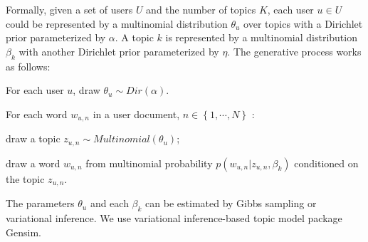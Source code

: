 \documentclass[preprint]{elsarticle}
\begin{document}
Formally, given a set of users $ U $ and the number of topics $ K $, each user $ u \in U $ could be represented by a multinomial distribution $ \theta_{u} $ over topics with a Dirichlet prior parameterized by $ \alpha $. 
A topic $ k $ is represented by a multinomial distribution $ \beta_{k} $ with another Dirichlet prior parameterized by $ \eta $. 
The generative process works as follows:
\begin{itemize*}
\item For each user $ u $, draw $ \theta_{u} \sim Dir \left(  \alpha \right) $.
\item For each word $ w_{u,n} $ in a user document, $ n \in \left\lbrace 1, \cdots, N \right\rbrace $ :
\begin{itemize*}
\item draw a topic $ z_{u,n} \sim Multinomial \left( \theta_{u}  \right) $;
\item draw a word $ w_{u,n} $ from multinomial probability $  p \left( w_{u,n} \vert z_{u,n}, \beta_{k}  \right) $ conditioned on the topic $ z_{u,n} $.
\end{itemize*}
\end{itemize*}
The parameters $ \theta_{u} $ and each $ \beta_{k} $ can be estimated by Gibbs sampling or variational inference.
We use variational inference-based topic model package Gensim\cite{rehurek_lrec}.
\end{document}
